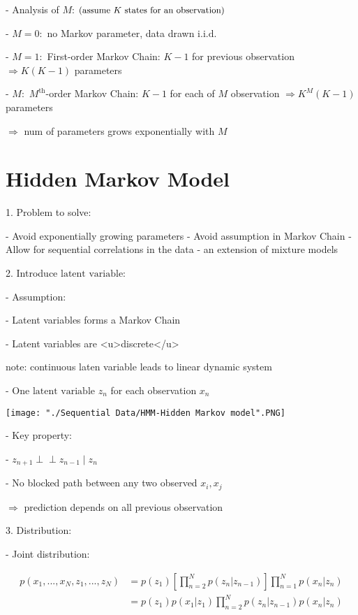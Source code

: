    - Analysis of $M$: $\small\text{(assume $K$ states for an observation)}$ 

     - $M=0:$ no Markov parameter, data drawn $\text{i.i.d.}$ 

     - $M=1:$ First-order Markov Chain: $K-1$ for previous observation $\Rightarrow K(K-1)$ parameters

     - $M:$ $M^{\text{th}}$-order Markov Chain: $K-1$ for each of $M$ observation $\Rightarrow K^M(K-1)$ parameters

       $\Rightarrow$ num of parameters grows exponentially with $M$ 

\section{Hidden Markov Model}

1. Problem to solve:

   - Avoid exponentially growing parameters
   - Avoid assumption in Markov Chain
   - Allow for sequential correlations in the data - an extension of mixture models

2. Introduce $\text{latent variable}$: 

   - Assumption:

     - Latent variables forms a Markov Chain

     - Latent variables are <u>discrete</u> 

       note: continuous laten variable leads to linear dynamic system

   - One $\text{latent variable}$ $z_n$ for each observation $x_n$ 

	\texttt{[image: "./Sequential Data/HMM-Hidden Markov model".PNG]}

   - Key property:

     - $z_{n+1} \perp\!\!\!\perp z_{n-1} \mid z_n$ 

     - No blocked path between any two observed $x_i,x_j$  

       $\Rightarrow$ prediction depends on all previous observation

3. Distribution:

   - Joint distribution:

      \begin{align} \displaystyle p(x_1,...,x_N,z_1,...,z_N) &= p(z_1)[\prod_{n=2}^N p(z_n|z_{n-1})]\prod_{n=1}^N p(x_n|z_n) \\ &= p(z_1)p(x_1|z_1)\prod_{n=2}^N p(z_n|z_{n-1}) p(x_n|z_n) \end{align} 

